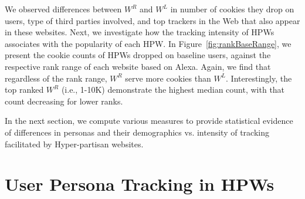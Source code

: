 \documentclass{article}
\newcommand{\hpw}{HPW\xspace}
\newcommand{\hpws}{HPWs\xspace}
\newcommand{\hpwlongs}{Hyper-partisan websites\xspace}
\begin{document}
\begin{figure*}[h]
    \centering
    \caption{
        (a) Overlap between third parties dropping cookies during persona building, and when the same personas visit \hpws.
        (b) Heat-map of KS statistic test for all pairwise comparisons between distributions of numbers of unique third parties serving cookies.
        All cells with $p\geq 0.01$ are whited out; only cells with $p<0.01$ are colored.
        (c) Percentage difference between third parties serving cookies to baseline and loaded personas.
        The	x-axis is sorted on medians of all personas.}
\end{figure*}

We observed differences between $W^R$ and $W^L$ in number of cookies they drop on users, type of third parties involved, and top trackers in the Web that also appear in these websites.
Next, we investigate how the tracking intensity of \hpws associates with the popularity of each \hpw.
In Figure~\ref{fig:rankBaseRange}, we present the cookie counts of \hpws dropped on baseline users, against the respective rank range of each website based on Alexa.
Again, we find that regardless of the rank range, $W^R$ serve more cookies than $W^L$.
Interestingly, the top ranked $W^R$ (i.e., 1-10K) demonstrate the highest median count, with that count decreasing for lower ranks.

In the next section, we compute various measures to provide statistical evidence of differences in personas and their demographics vs. intensity of tracking facilitated by \hpwlongs.

\section{User Persona Tracking in HPW\lowercase{s}} \label{sec:results-personas}
\end{document}
